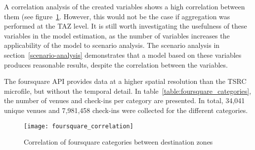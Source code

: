 A correlation analysis of the created variables shows a high correlation between them (see figure~\ref{fig:foursquare-correlation}. However, this would not be the case if aggregation was performed at the TAZ level. It is still worth investigating the usefulness of these variables in the model estimation, as the number of variables increases the applicability of the model to scenario analysis.  The scenario analysis in section~\ref{scenario-analysis} demonstrates that a model based on these variables produces reasonable results, despite the correlation between the variables.

The foursquare API provides data at a higher spatial resolution than the TSRC microfile, but without the temporal detail. In table~\ref{table:foursquare_categories}, the number of venues and check-ins per category are presented. In total, 34,041 unique venues and 7,981,458 check-ins were collected for the different categories.
\begin{figure}[H]
\centering
\texttt{[image: foursquare\_correlation]}
\caption{Correlation of foursquare categories between destination zones}
\label{fig:foursquare-correlation}
\end{figure}




